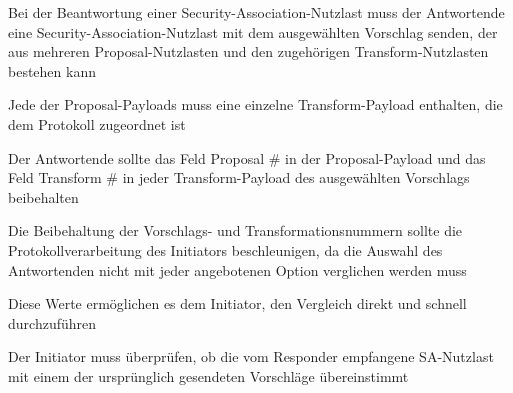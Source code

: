 \documentclass[a4paper]{article}
\begin{document}
\begin{multicols}{3}
\begin{itemize*}
            \item Bei der Beantwortung einer Security-Association-Nutzlast muss der Antwortende eine Security-Association-Nutzlast mit dem ausgewählten Vorschlag senden, der aus mehreren Proposal-Nutzlasten und den zugehörigen Transform-Nutzlasten bestehen kann
            \item Jede der Proposal-Payloads muss eine einzelne Transform-Payload enthalten, die dem Protokoll zugeordnet ist
            \item Der Antwortende sollte das Feld Proposal \# in der Proposal-Payload und das Feld Transform \# in jeder Transform-Payload des ausgewählten Vorschlags beibehalten
            \begin{itemize*}
                  \item Die Beibehaltung der Vorschlags- und Transformationsnummern sollte die Protokollverarbeitung des Initiators beschleunigen, da die Auswahl des Antwortenden nicht mit jeder angebotenen Option verglichen werden muss
                  \item Diese Werte ermöglichen es dem Initiator, den Vergleich direkt und schnell durchzuführen
            \end{itemize*}
            \item Der Initiator muss überprüfen, ob die vom Responder empfangene SA-Nutzlast mit einem der ursprünglich gesendeten Vorschläge übereinstimmt
      \end{itemize*}


\end{multicols}
\end{document}
